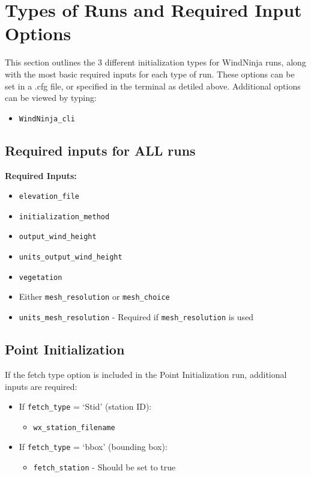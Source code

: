 \documentclass[12pt]{article}
\begin{document}
\section*{Types of Runs and Required Input Options}

This section outlines the 3 different initialization types for WindNinja runs, along with the most basic required inputs for each type of run. These options can be set in a .cfg file, or specified in the terminal as detiled above. Additional options can be viewed by typing: 
\begin{itemize}
\item[]\texttt{WindNinja\_cli} 
\end{itemize}



\subsection*{Required inputs for ALL runs}

\textbf{Required Inputs:}
\begin{itemize}
    \item \texttt{elevation\_file}
    \item \texttt{initialization\_method}
    \item \texttt{output\_wind\_height}
    \item \texttt{units\_output\_wind\_height}
    \item \texttt{vegetation}
    \item Either \texttt{mesh\_resolution} or \texttt{mesh\_choice}
    \item \texttt{units\_mesh\_resolution} - Required if \texttt{mesh\_resolution} is used
\end{itemize}

\subsection*{Point Initialization}
If the fetch type option is included in the Point Initialization run, additional inputs are required:

\begin{itemize}
    \item If \texttt{fetch\_type} = `Stid' (station ID):
        \begin{itemize}
            \item \texttt{wx\_station\_filename}
        \end{itemize}
                       
    \item If \texttt{fetch\_type} = `bbox' (bounding box):
        \begin{itemize}
            \item \texttt{fetch\_station} - Should be set to true
        \end{itemize}
\end{itemize}
\end{document}
